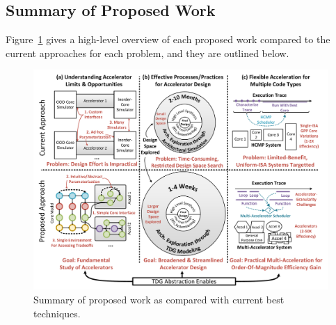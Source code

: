 \subsection{Summary of Proposed Work}

Figure~\ref{fig:proposed-work-overview} gives a high-level overview of each
proposed work compared to the current approaches for each problem, 
and they are outlined below.

\begin{figure}
\vspace{-.2in}
\begin{adjustwidth}{-0.3in}{-0.3in}
  \begin{center}
    \includegraphics[width=1.0\linewidth]{figs/proposed-work.pdf}
  \end{center}
\vspace{-0.2in}
  \caption{Summary of proposed work as compared with current best techniques.}
  \label{fig:proposed-work-overview}
\vspace{-0.05in}
\end{adjustwidth}
\end{figure}


